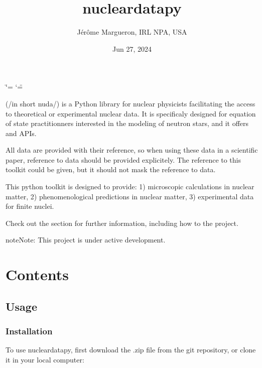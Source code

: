 \documentclass[letterpaper,10pt,english]{sphinxmanual}
\title{nucleardatapy}
\date{Jun 27, 2024}
\author{Jérôme Margueron, IRL NPA, USA}
\begin{document}
\ifdefined\shorthandoff
  \ifnum\catcode`\=\string=\active\shorthandoff{=}\fi
  \ifnum\catcode`\"=\active{}\fi
\fi

\pagestyle{empty}
\sphinxmaketitle
\pagestyle{plain}
\sphinxtableofcontents
\pagestyle{normal}
\label{\detokenize{index::doc}}


\sphinxAtStartPar
{} (/in short nuda/) is a Python library for nuclear physicists facilitating the access to theoretical or experimental nuclear data. It is specificaly designed for equation of state practitionners interested in the modeling of neutron stars, and it offers  and  APIs.

\sphinxAtStartPar
All data are provided with their reference, so when using these data in a scientific paper, reference to data should be provided explicitely. The reference to this toolkit could be given, but it should not mask the reference to data.

\sphinxAtStartPar
This python toolkit is designed to provide:
1) microscopic calculations in nuclear matter,
2) phenomenological predictions in nuclear matter,
3) experimental data for finite nuclei.

\sphinxAtStartPar
Check out the {\hyperref[\detokenize{source/usage::doc}]{}} section for further information, including how to
{\hyperref[\detokenize{source/usage:installation}]{}} the project.

\begin{sphinxadmonition}{note}{Note:}
\sphinxAtStartPar
This project is under active development.
\end{sphinxadmonition}


\chapter{Contents}
\label{\detokenize{index:contents}}
\sphinxstepscope


\section{Usage}
\label{\detokenize{source/usage:usage}}\label{\detokenize{source/usage::doc}}

\subsection{Installation}
\label{\detokenize{source/usage:installation}}\label{\detokenize{source/usage:id1}}
\sphinxAtStartPar
To use nucleardatapy, first download the .zip file from the git repository, or clone it in your local computer:
\end{document}
